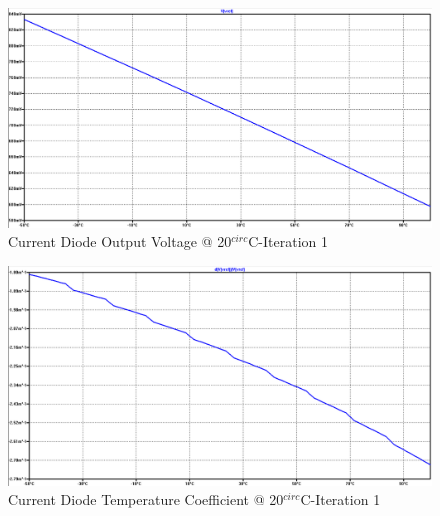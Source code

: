 \begin{figure}[!htbp]
  	\centering
  	\includegraphics[scale=0.15]{images/appendix/cd1-vref.png}
  	\caption[output-z-meas]{Current Diode Output Voltage @ 20$^{circ}$C-Iteration 1}
  	\label{fig:cd1-vref}
	\end{figure}
\begin{figure}[!htbp]
  	\centering
  	\includegraphics[scale=0.15]{images/appendix/cd1-tempco.png}
  	\caption[output-z-meas]{Current Diode Temperature Coefficient @ 20$^{circ}$C-Iteration 1}
  	\label{fig:cd1-tempco}
	\end{figure}

